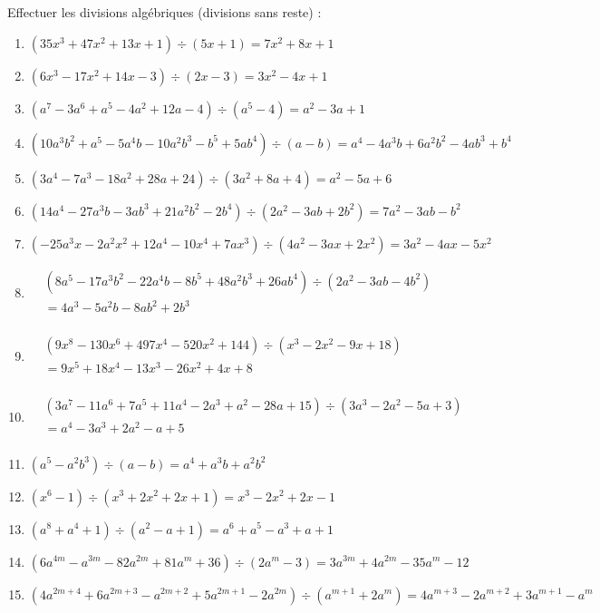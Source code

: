 \begin{solution}
Effectuer les divisions algébriques (divisions sans reste) :
\begin{enumerate}
\item $(35{{x}^{3}}+47{{x}^{2}}+13x+1)\div (5x+1)=7{{x}^{2}}+8x+1$
\item $(6{{x}^{3}}-17{{x}^{2}}+14x-3)\div (2x-3)=3{{x}^{2}}-4x+1$
\item $({{a}^{7}}-3{{a}^{6}}+{{a}^{5}}-4{{a}^{2}}+12a-4)\div ({{a}^{5}}-4)={{a}^{2}}-3a+1$
\item $(10{{a}^{3}}{{b}^{2}}+{{a}^{5}}-5{{a}^{4}}b-10{{a}^{2}}{{b}^{3}}-{{b}^{5}}+5a{{b}^{4}})\div (a-b)={{a}^{4}}-4{{a}^{3}}b+6{{a}^{2}}{{b}^{2}}-4a{{b}^{3}}+{{b}^{4}}$
\item $(3{{a}^{4}}-7{{a}^{3}}-18{{a}^{2}}+28a+24)\div (3{{a}^{2}}+8a+4)={{a}^{2}}-5a+6$
\item $(14{{a}^{4}}-27{{a}^{3}}b-3a{{b}^{3}}+21{{a}^{2}}{{b}^{2}}-2{{b}^{4}})\div (2{{a}^{2}}-3ab+2{{b}^{2}})=7{{a}^{2}}-3ab-{{b}^{2}}$
\item $(-25{{a}^{3}}x-2{{a}^{2}}{{x}^{2}}+12{{a}^{4}}-10{{x}^{4}}+7a{{x}^{3}})\div (4{{a}^{2}}-3ax+2{{x}^{2}})=3{{a}^{2}}-4ax-5{{x}^{2}}$
\item $\begin{array}{ll}
  & (8{{a}^{5}}-17{{a}^{3}}{{b}^{2}}-22{{a}^{4}}b-8{{b}^{5}}+48{{a}^{2}}{{b}^{3}}+26a{{b}^{4}})\div (2{{a}^{2}}-3ab-4{{b}^{2}}) \\ 
 & =4{{a}^{3}}-5{{a}^{2}}b-8a{{b}^{2}}+2{{b}^{3}} \\ 
\end{array}$
\item $\begin{array}{ll}
  & (9{{x}^{8}}-130{{x}^{6}}+497{{x}^{4}}-520{{x}^{2}}+144)\div ({{x}^{3}}-2{{x}^{2}}-9x+18) \\ 
 & =9{{x}^{5}}+18{{x}^{4}}-13{{x}^{3}}-26{{x}^{2}}+4x+8 \\ 
\end{array}$
\item $\begin{array}{ll}
  & (3{{a}^{7}}-11{{a}^{6}}+7{{a}^{5}}+11{{a}^{4}}-2{{a}^{3}}+{{a}^{2}}-28a+15)\div (3{{a}^{3}}-2{{a}^{2}}-5a+3) \\ 
 & ={{a}^{4}}-3{{a}^{3}}+2{{a}^{2}}-a+5 \\ 
\end{array}$
\item $({{a}^{5}}-{{a}^{2}}{{b}^{3}})\div (a-b)={{a}^{4}}+{{a}^{3}}b+{{a}^{2}}{{b}^{2}}$		
\item $({{x}^{6}}-1)\div ({{x}^{3}}+2{{x}^{2}}+2x+1)={{x}^{3}}-2{{x}^{2}}+2x-1$	
\item $({{a}^{8}}+{{a}^{4}}+1)\div ({{a}^{2}}-a+1)={{a}^{6}}+{{a}^{5}}-{{a}^{3}}+a+1$		
\item $(6{{a}^{4m}}-{{a}^{3m}}-82{{a}^{2m}}+81{{a}^{m}}+36)\div (2{{a}^{m}}-3)=3{{a}^{3m}}+4{{a}^{2m}}-35{{a}^{m}}-12$	
\item $(4{{a}^{2m+4}}+6{{a}^{2m+3}}-{{a}^{2m+2}}+5{{a}^{2m+1}}-2{{a}^{2m}})\div ({{a}^{m+1}}+2{{a}^{m}})=4{{a}^{m+3}}-2{{a}^{m+2}}+3{{a}^{m+1}}-{{a}^{m}}$
\end{enumerate}
\end{solution}

